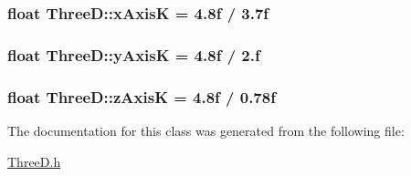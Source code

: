 \subsubsection[{\texorpdfstring{x\+AxisK}{xAxisK}}]{\setlength{\rightskip}{0pt plus 5cm}float Three\+D\+::x\+AxisK = 4.\+8f / 3.\+7f\hspace{0.3cm}{\ttfamily [private]}}\hypertarget{classThreeD_a79ec8e0ca613b8900a61b5ee91802641}{}\label{classThreeD_a79ec8e0ca613b8900a61b5ee91802641}
\subsubsection[{\texorpdfstring{y\+AxisK}{yAxisK}}]{\setlength{\rightskip}{0pt plus 5cm}float Three\+D\+::y\+AxisK = 4.\+8f / 2.\+f\hspace{0.3cm}{\ttfamily [private]}}\hypertarget{classThreeD_a5c1e6590e023b722f328c40c7c332907}{}\label{classThreeD_a5c1e6590e023b722f328c40c7c332907}
\subsubsection[{\texorpdfstring{z\+AxisK}{zAxisK}}]{\setlength{\rightskip}{0pt plus 5cm}float Three\+D\+::z\+AxisK = 4.\+8f / 0.\+78f\hspace{0.3cm}{\ttfamily [private]}}\hypertarget{classThreeD_a243c98ad206c311825280b150ae14ba3}{}\label{classThreeD_a243c98ad206c311825280b150ae14ba3}


The documentation for this class was generated from the following file\+:\begin{DoxyCompactItemize}
\item 
\hyperlink{ThreeD_8h}{Three\+D.\+h}\end{DoxyCompactItemize}
